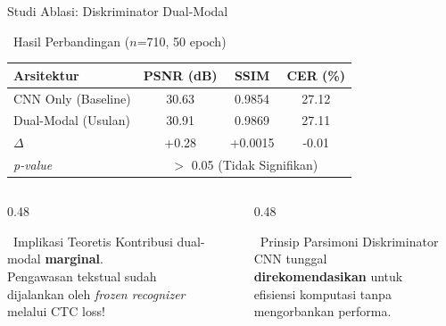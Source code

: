 \documentclass[aspectratio=169,10pt,t]{beamer}
\begin{document}
\begin{frame}{Studi Ablasi: Diskriminator Dual-Modal}
    \begin{block}{\faSearch~Hasil Perbandingan ($n$=710, 50 epoch)}
        \centering
        \begin{tabular}{lccc}
            \toprule
            \textbf{Arsitektur} & \textbf{PSNR (dB)} & \textbf{SSIM} & \textbf{CER (\%)} \\
            \midrule
            CNN Only (Baseline) & 30.63 & 0.9854 & 27.12 \\
            Dual-Modal (Usulan) & 30.91 & 0.9869 & 27.11 \\
            \midrule
            $\Delta$ & +0.28 & +0.0015 & -0.01 \\
            \textit{p-value} & \multicolumn{3}{c}{$>$ 0.05 (Tidak Signifikan)} \\
            \bottomrule
        \end{tabular}
    \end{block}
    
    \vspace{0.5em}
    \begin{columns}[T]
        \begin{column}{0.48\textwidth}
            \begin{alertblock}{\faLightbulb~Implikasi Teoretis}
                Kontribusi dual-modal \textbf{marginal}.\\
                Pengawasan tekstual sudah\\
                dijalankan oleh \textit{frozen recognizer}\\
                melalui CTC loss!
            \end{alertblock}
        \end{column}
        \begin{column}{0.48\textwidth}
            \begin{exampleblock}{\faBalanceScale~Prinsip Parsimoni}
                Diskriminator CNN tunggal\\
                \textbf{direkomendasikan} untuk\\
                efisiensi komputasi tanpa\\
                mengorbankan performa.
            \end{exampleblock}
        \end{column}
    \end{columns}
\end{frame}
\end{document}
